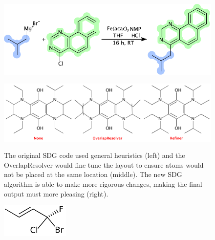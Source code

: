 \documentclass[10pt]{bmcart}
\begin{document}
\begin{backmatter}
\begin{figure}[h!]
  \caption{}
  \centering
  \includegraphics[width=\textwidth]{img/US20140231770A1_0287.pdf}
  \label{fig:depiction}
\end{figure}

\begin{figure}[h!]
  \caption{
    The original SDG code used general heuristics (left) and the
    OverlapResolver would fine tune the layout to ensure atoms would not be placed
    at the same location (middle). The new SDG algorithm is able to
    make more rigorous changes, making the final output must more pleasing
    (right).}
    \includegraphics[width=\textwidth]{sdg.png}
    \label{fig:sdg}
\end{figure}

\begin{figure}[h!]
  \caption{}
  \centering
  \includegraphics[width=0.3\textwidth]{sdg2.png}
  \label{fig:sdgstereo}
\end{figure}



\end{backmatter}
\end{document}
